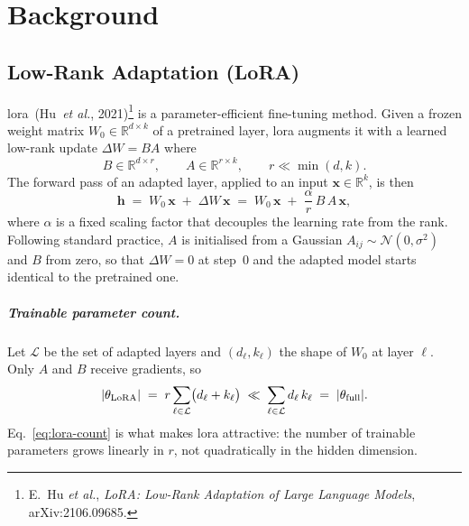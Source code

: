 \documentclass[12pt, a4paper]{report}
\DeclarePairedDelimiter{\abs}{\lvert}{\rvert}
\begin{document}
\chapter{Background}
\label{ch:background}

\section{Low-Rank Adaptation (LoRA)}
\label{sec:lora}

\gls{lora}~(Hu~\emph{et al.}, 2021)\footnote{E.~Hu \emph{et al.},
\emph{LoRA: Low-Rank Adaptation of Large Language Models}, arXiv:2106.09685.}
is a parameter-efficient fine-tuning method. Given a frozen weight matrix
\(W_0 \in \mathbb{R}^{d \times k}\) of a pretrained layer, \gls{lora}
augments it with a learned low-rank update \(\Delta W = B A\) where
\begin{equation}
  B \in \mathbb{R}^{d \times r}, \qquad
  A \in \mathbb{R}^{r \times k}, \qquad
  r \ll \min(d, k).
  \label{eq:lora-factors}
\end{equation}
The forward pass of an adapted layer, applied to an input
\(\bm{x} \in \mathbb{R}^{k}\), is then
\begin{equation}
  \bm{h} \;=\; W_0\,\bm{x} \;+\; \Delta W\,\bm{x}
          \;=\; W_0\,\bm{x} \;+\; \frac{\alpha}{r}\,B\,A\,\bm{x},
  \label{eq:lora-forward}
\end{equation}
where \(\alpha\) is a fixed scaling factor that decouples the learning rate
from the rank. Following standard practice, \(A\) is initialised from a
Gaussian \(A_{ij} \sim \mathcal{N}(0,\sigma^{2})\) and \(B\) from zero, so
that \(\Delta W = 0\) at step~0 and the adapted model starts identical to
the pretrained one.

\paragraph{Trainable parameter count.} Let \(\mathcal{L}\) be the set of
adapted layers and \((d_\ell, k_\ell)\) the shape of \(W_0\) at layer
\(\ell\). Only \(A\) and \(B\) receive gradients, so
\begin{equation}
  \abs{\theta_{\mathrm{LoRA}}}
    \;=\; r \sum_{\ell \in \mathcal{L}} \bigl(d_\ell + k_\ell\bigr)
    \;\ll\; \sum_{\ell \in \mathcal{L}} d_\ell\,k_\ell
    \;=\; \abs{\theta_{\mathrm{full}}}.
  \label{eq:lora-count}
\end{equation}
Eq.~\eqref{eq:lora-count} is what makes \gls{lora} attractive: the number
of trainable parameters grows linearly in \(r\), not quadratically in the
hidden dimension.
\end{document}

